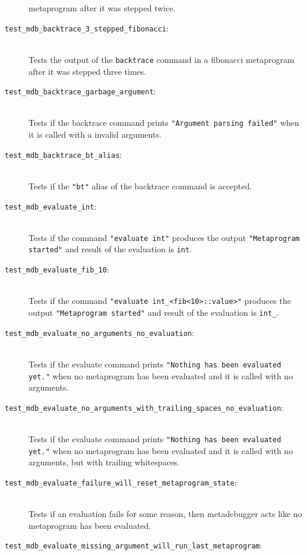 \begin{description}
        metaprogram after it was stepped twice.
    \item[\texttt{test\_mdb\_backtrace\_3\_stepped\_fibonacci}:] \hfill \\
        Tests the output of the \texttt{backtrace} command in a fibonacci
        metaprogram after it was stepped three times.
    \item[\texttt{test\_mdb\_backtrace\_garbage\_argument}:] \hfill \\
        Tests if the backtrace command prints
        \texttt{"Argument parsing failed"} when it is called with a invalid
        arguments.
    \item[\texttt{test\_mdb\_backtrace\_bt\_alias}:] \hfill \\
        Tests if the \texttt{"bt"} alias of the backtrace command is
        accepted.
    \item[\texttt{test\_mdb\_evaluate\_int}:] \hfill \\
        Tests if the command \texttt{"evaluate int"} produces the output
        \texttt{"Metaprogram started"} and result of the evaluation is
        \texttt{int}.
    \item[\texttt{test\_mdb\_evaluate\_fib\_10}:] \hfill \\
        Tests if the command \texttt{"evaluate int\_<fib<10>::value>"} produces
        the output \texttt{"Metaprogram started"} and result of the evaluation
        is \texttt{int\_<55>}.
    \item[\texttt{test\_mdb\_evaluate\_no\_arguments\_no\_evaluation}:] \hfill \\
        Tests if the evaluate command prints
        \texttt{"Nothing has been evaluated yet."} when no metaprogram has been
        evaluated and it is called with no arguments.
    \item[\texttt{test\_mdb\_evaluate\_no\_arguments\_with\_trailing\_spaces\_no\_evaluation}:] \hfill \\
        Tests if the evaluate command prints
        \texttt{"Nothing has been evaluated yet."} when no metaprogram has been
        evaluated and it is called with no arguments, but with trailing
        whitespaces.
    \item[\texttt{test\_mdb\_evaluate\_failure\_will\_reset\_metaprogram\_state}:] \hfill \\
        Tests if an evaluation fails for some reason, then metadebugger acts
        like no metaprogram has been evaluated.
    \item[\texttt{test\_mdb\_evaluate\_missing\_argument\_will\_run\_last\_metaprogram}:] \hfill \\

\end{description}
